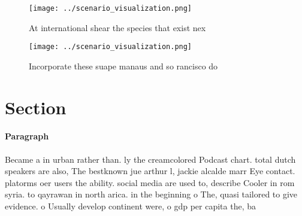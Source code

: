 \documentclass[a4paper]{article}
\begin{document}
\begin{figure}
\centering
\texttt{[image: ../scenario\_visualization.png]}
\caption{At international shear the species that exist nex
}
\end{figure}
 
\begin{figure}
\centering
\texttt{[image: ../scenario\_visualization.png]}
\caption{Incorporate these suape manaus and so rancisco do
}
\end{figure}
 
\section{Section}

\paragraph{Paragraph}
Became a in urban rather than. ly the creamcolored Podcast chart. total dutch speakers are also, The bestknown jue arthur l, jackie alcalde marr Eye contact. platorms oer users the ability. social media are used to, describe Cooler in rom syria. to qayrawan in north arica. in the beginning o The, quasi tailored to give evidence. o Usually develop continent were, o gdp per capita the, ba
\end{document}
